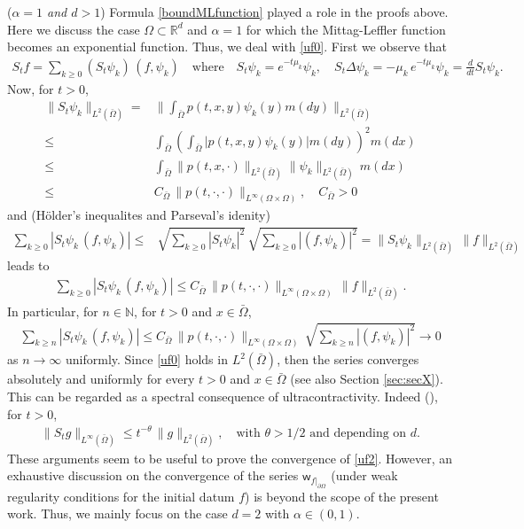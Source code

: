 \documentclass[11pt,a4paper]{article}
\begin{document}
({\it $\alpha=1$ and $d>1$}) Formula \eqref{boundMLfunction} played a role in the proofs above. Here we discuss the case $\Omega \subset \mathbb{R}^d$ and $\alpha=1$ for which the Mittag-Leffler function becomes an exponential function. Thus, we deal with \eqref{uf0}. First we observe that
\begin{align*}
S_t f = \sum_{k \geq 0} (S_t \psi_k)\, (f, \psi_k) \quad \textrm{where} \quad S_t \psi_k = e^{-t \mu_k} \psi_k, \quad  S_t \Delta \psi_k =  - \mu_k\, e^{-t \mu_k} \psi_k = \frac{d}{dt} S_t \psi_k.
\end{align*}
Now, for $t>0$,
\begin{align*}
\| S_t \psi_k \|_{L^2(\bar{\Omega})} 
= & \Big\| \int_{\bar{\Omega}} p(t,x,y) \psi_k(y) m(dy) \Big\|_{L^2(\bar{\Omega})}\\
\leq & \int_{\bar{\Omega}}  \left( \int_{\bar{\Omega}}  \big| p(t,x,y) \psi_k(y) \big| m(dy) \right)^2 m(dx)\\
\leq & \int_{\bar{\Omega}} \| p(t,x, \cdot) \|_{L^2(\bar{\Omega})} \|\psi_k \|_{L^2(\bar{\Omega})} \, m(dx)\\
\leq & C_{\bar{\Omega}}\, \| p(t, \cdot, \cdot) \|_{L^\infty(\Omega \times \Omega)}, \quad C_{\bar{\Omega}} >0
\end{align*}
and (H\"{o}lder's inequalites and Parseval's idenity)
\begin{align*}
\sum_{k \geq 0} |S_t \psi_k\, (f, \psi_k)| 
\leq & \sqrt{\sum_{k \geq 0} |S_t \psi_k|^2}\, \sqrt{\sum_{k \geq 0} |(f,\psi_k) |^2 } = \| S_t \psi_k \|_{L^2(\bar{\Omega})} \, \| f\|_{L^2(\bar{\Omega})}
\end{align*}
leads to
\begin{align*}
\sum_{k \geq 0} |S_t \psi_k\, (f, \psi_k)| \leq C_{\bar{\Omega}}\, \| p(t, \cdot, \cdot) \|_{L^\infty(\Omega \times \Omega)}\, \| f\|_{L^2(\bar{\Omega})}.
\end{align*}
In particular, for $n \in \mathbb{N}$, for $t>0$ and $x \in \bar{\Omega}$,
\begin{align}
\sum_{k \geq n} |S_t \psi_k\, (f, \psi_k)| \leq C_{\bar{\Omega}}\, \| p(t, \cdot, \cdot) \|_{L^\infty(\Omega \times \Omega)}\, \sqrt{\sum_{k \geq n} |(f, \psi_k)|^2} \to 0
\label{UnifNormS}
\end{align}
as $n\to \infty$ uniformly. Since \eqref{uf0} holds in $L^2(\bar{\Omega})$, then the series converges absolutely and uniformly for every $t>0$ and $x \in \bar{\Omega}$ (see also Section \ref{sec:secX}). This can be regarded as a spectral consequence of ultracontractivity. Indeed (\cite[Proposition 2.6]{AMPR03}), for $t>0$, 
\begin{align}
\| S_t g \|_{L^\infty(\bar{\Omega})} \leq t^{-\theta}\, \| g \|_{L^2(\bar{\Omega})}, \quad \textrm{with $\theta>1/2$ and depending on $d$} .
\label{UltraContrctS}
\end{align}
These arguments seem to be useful to prove the convergence of \eqref{uf2}. However, an exhaustive discussion on the convergence of the series $\mathsf{w}_{f|_{\partial \Omega}}$ (under weak regularity conditions for the initial datum $f$) is beyond the scope of the present work. Thus, we mainly focus on the case $d=2$ with $\alpha \in (0,1)$.\\ 
\end{document}
